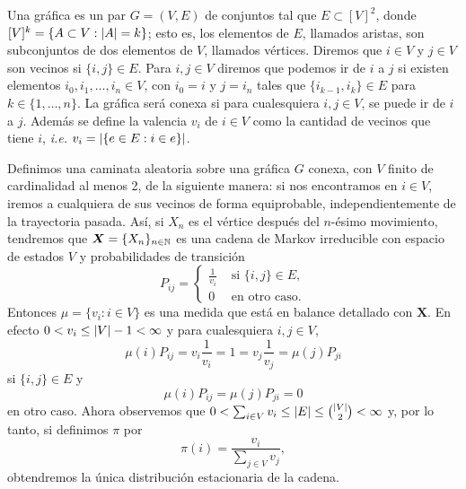 \begin{example} \label{ej:caminatas sobre graficas}
    Una gráfica es un par $G = (V, E)$ de conjuntos tal que $E \subset [V]^2$, donde $[V]^k = \{A \subset V : \left\lvert A \right\rvert = k\}$; esto es, los elementos de $E$, llamados aristas, son subconjuntos de dos elementos de $V$, llamados vértices. Diremos que $i \in V$ y $j \in V$ son vecinos si $\{i, j\} \in E$. Para $i, j \in V$ diremos que podemos ir de $i$ a $j$ si existen elementos $i_0, i_1, \ldots, i_n \in V$, con $i_0 = i$ y $j = i_n$ tales que $\{i_{k-1}, i_k\} \in E$ para $k \in \{1, \ldots, n\}$. La gráfica será conexa si para cualesquiera $i, j \in V$, se puede ir de $i$ a $j$. Además se define la valencia $v_i$ de $i \in V$ como la cantidad de vecinos que tiene $i$, \emph{i.e.} $v_i = \left\lvert \{e \in E : i \in e\} \right\rvert$.

    Definimos una caminata aleatoria sobre una gráfica $G$ conexa, con $V$ finito de cardinalidad al menos 2, de la siguiente manera: si nos encontramos en $i \in V$, iremos a cualquiera de sus vecinos de forma equiprobable, independientemente de la trayectoria pasada. Así, si $X_n$ es el vértice después del $n$-ésimo movimiento, tendremos que $\bm X = \{X_n\}_{n \in \mathbb{N}}$ es una cadena de Markov irreducible con espacio de estados $V$ y probabilidades de transición
    \[
        P_{ij} = \begin{cases}
            \frac 1 {v_i} & \text{ si } \{i, j\} \in E, \\
            0 & \text{ en otro caso}.
        \end{cases}    
    \]
    Entonces $\mu = \{v_i : i \in V\}$ es una medida que está en balance detallado con $\bm X$. En efecto $0 < v_i \leq \left\lvert V \right\rvert - 1 < \infty$ y para cualesquiera $i, j \in V$,
    \[
        \mu(i) P_{ij} = v_i \frac 1 {v_i} = 1 = v_j \frac 1 {v_j} = \mu(j) P_{ji}   
    \] si $\{i,j\} \in E$ y 
    \[
        \mu(i) P_{ij} = \mu(j) P_{ji} = 0
    \] en otro caso. Ahora observemos que $0 < \sum_{i \in V} v_i \leq \left\lvert E \right\rvert \leq \binom{\left\lvert V \right\rvert}{2} < \infty$ y, por lo tanto, si definimos $\pi$ por
    \[
        \pi(i) = \frac{v_i}{\sum_{j \in V} v_j},
    \]
    obtendremos la única distribución estacionaria de la cadena.
\end{example}

